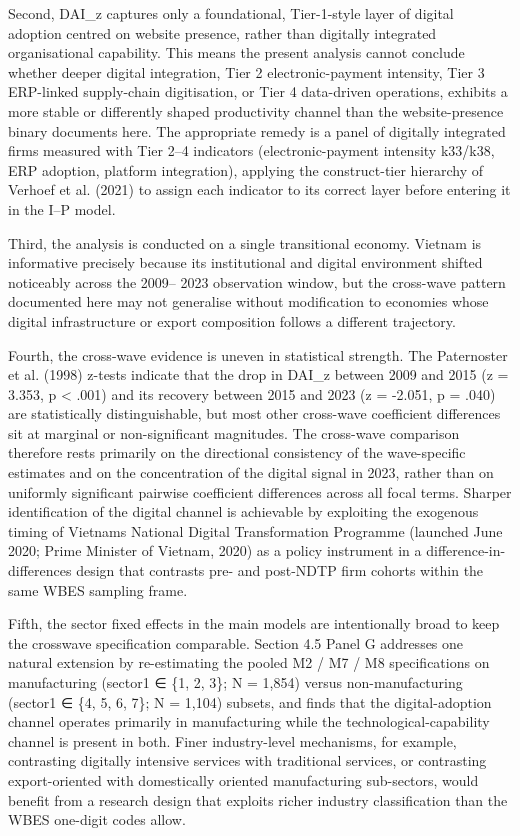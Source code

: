 \documentclass[12pt,a4paper]{article}
\begin{document}
Second, DAI\_z captures only a foundational, Tier-1-style layer of
digital adoption centred on website presence, rather than digitally
integrated organisational capability. This means the present analysis
cannot conclude whether deeper digital integration, Tier 2
electronic-payment intensity, Tier 3 ERP-linked supply-chain
digitisation, or Tier 4 data-driven operations, exhibits a more stable
or differently shaped productivity channel than the website-presence
binary documents here. The appropriate remedy is a panel of digitally
integrated firms measured with Tier 2--4 indicators (electronic-payment
intensity k33/k38, ERP adoption, platform integration), applying the
construct-tier hierarchy of Verhoef et al. (2021) to assign each
indicator to its correct layer before entering it in the I--P model.

Third, the analysis is conducted on a single transitional economy.
Vietnam is informative precisely because its institutional and digital
environment shifted noticeably across the 2009-- 2023 observation
window, but the cross-wave pattern documented here may not generalise
without modification to economies whose digital infrastructure or export
composition follows a different trajectory.

Fourth, the cross-wave evidence is uneven in statistical strength. The
Paternoster et al. (1998) z-tests indicate that the drop in DAI\_z
between 2009 and 2015 (z = 3.353, p \textless{} .001) and its recovery
between 2015 and 2023 (z = -2.051, p = .040) are statistically
distinguishable, but most other cross-wave coefficient differences sit
at marginal or non-significant magnitudes. The cross-wave comparison
therefore rests primarily on the directional consistency of the
wave-specific estimates and on the concentration of the digital signal
in 2023, rather than on uniformly significant pairwise coefficient
differences across all focal terms. Sharper identification of the
digital channel is achievable by exploiting the exogenous timing of
Vietnam\textquotesingle s National Digital Transformation Programme
(launched June 2020; Prime Minister of Vietnam, 2020) as a policy
instrument in a difference-in-differences design that contrasts pre- and
post-NDTP firm cohorts within the same WBES sampling frame.

Fifth, the sector fixed effects in the main models are intentionally
broad to keep the crosswave specification comparable. Section 4.5 Panel
G addresses one natural extension by re-estimating the pooled M2 / M7 /
M8 specifications on manufacturing (sector1 ∈ \{1, 2, 3\}; N = 1,854)
versus non-manufacturing (sector1 ∈ \{4, 5, 6, 7\}; N = 1,104) subsets,
and finds that the digital-adoption channel operates primarily in
manufacturing while the technological-capability channel is present in
both. Finer industry-level mechanisms, for example, contrasting
digitally intensive services with traditional services, or contrasting
export-oriented with domestically oriented manufacturing sub-sectors,
would benefit from a research design that exploits richer industry
classification than the WBES one-digit codes allow.
\end{document}

